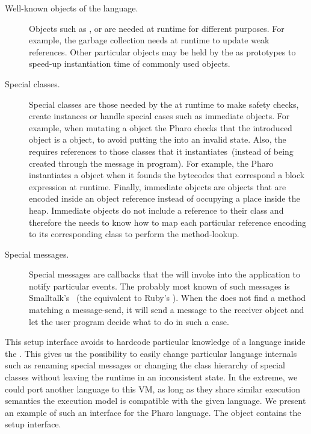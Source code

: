 \begin{description}
\item[Well-known objects of the language.] Objects such as ,  or  are needed at runtime for different purposes. For example, the garbage collection needs  at runtime to update weak references. Other particular objects may be held by the \VM as prototypes to speed-up instantiation time of commonly used objects.
\item[Special classes.] Special classes are those needed by the \VM at runtime to make safety checks, create instances or handle special cases such as immediate objects. For example, when mutating a  object the Pharo \VM checks that the introduced object is a  object, to avoid putting the  into an invalid state. Also, the \VM requires references to those classes that it instantiates~(instead of being created through the  message in program). For example, the Pharo \VM instantiates a  object when it founds the bytecodes that correspond a block expression at runtime. Finally, immediate objects are objects that are encoded inside an object reference instead of occupying a place inside the heap. Immediate objects do not include a reference to their class and therefore the \VM needs to know how to map each particular reference encoding to its corresponding class to perform the method-lookup. 
\item[Special messages.] Special messages are callbacks that the \VM will invoke into the application to notify particular events. The probably most known of such messages is Smalltalk's ~(the equivalent to \eg Ruby's ). When the \VM does not find a method matching a message-send, it will send a  message to the receiver object and let the user program decide what to do in such a case.
\end{description}

This \VM setup interface avoids to hardcode particular knowledge of a language inside the \VM. This gives us the possibility to easily change particular language internals such as renaming special messages or changing the class hierarchy of special classes without leaving the runtime in an inconsistent state. In the extreme, we could port another language to this VM, as long as they share similar execution semantics \ie the \VM execution model is compatible with the given language. We present an example of such an interface for the Pharo language. The  object contains the \VM setup interface. 

